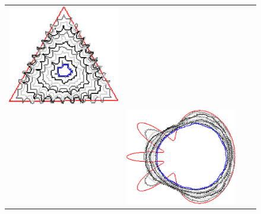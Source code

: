 \begin{figure}
\begin{tabular}{p{2.5em}ccc}
\includegraphics[scale=0.23]{figures/chapter6/radius-effect/triangle/improve/len_pen0/radius-9/summary.pdf} \\[2em]
& \includegraphics[scale=0.23]{figures/chapter6/radius-effect/flower/improve/len_pen0/radius-3/summary.pdf} &

\end{tabular}
\end{figure}
